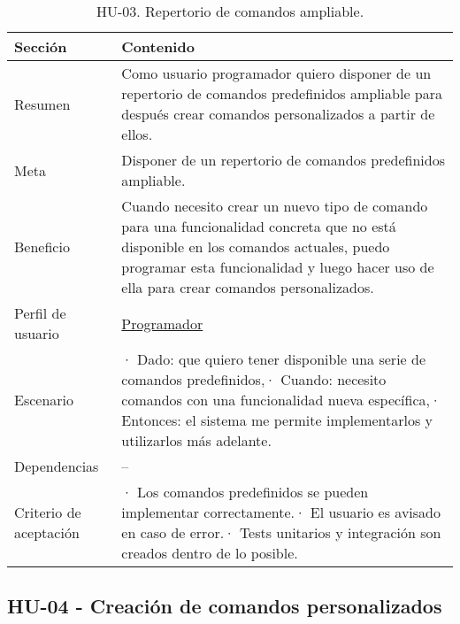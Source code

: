 \begin{table}[H]
    \centering
    \def\arraystretch{1.25}
    \begin{adjustbox}{max width=\textwidth}
    \begin{tabularx}{\textwidth}{|l|L|}
    \hline
        \textbf{Sección} & \textbf{Contenido} \\ \hline
    \hline
        Resumen & Como usuario programador quiero disponer de un repertorio de comandos predefinidos ampliable para después crear comandos personalizados a partir de ellos. \\ \hline
        Meta & Disponer de un repertorio de comandos predefinidos ampliable. \\ \hline
        Beneficio & Cuando necesito crear un nuevo tipo de comando para una funcionalidad concreta que no está disponible en los comandos actuales, puedo programar esta funcionalidad y luego hacer uso de ella para crear comandos personalizados. \\ \hline
        Perfil de usuario & \hyperref[sec:personaProgramador]{Programador} \\ \hline
        Escenario & · Dado: que quiero tener disponible una serie de comandos predefinidos,\linebreak · Cuando: necesito comandos con una funcionalidad nueva específica,\linebreak · Entonces: el sistema me permite implementarlos y utilizarlos más adelante. \\ \hline
        Dependencias & – \\ \hline
        Criterio de aceptación & · Los comandos predefinidos se pueden implementar correctamente.\linebreak · El usuario es avisado en caso de error.\linebreak · Tests unitarios y integración son creados dentro de lo posible. \\ \hline
    \end{tabularx}
    \end{adjustbox}
    \caption{HU-03. Repertorio de comandos ampliable.}
\end{table}

\subsection{HU-04 - Creación de comandos personalizados}
\label{sec:hu04}

